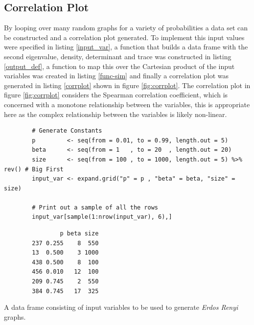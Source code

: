 \documentclass[11pt, twoside]{report}
\begin{document}
\subsection{Correlation Plot}
\label{correlation-plot}
By looping over many random graphs for a variety of probabilities a data set can
be constructed and a correlation plot generated. To implement this input values
were specified in listing \ref{input_var}, a function that builds a data frame with
the second eigenvalue, density, determinant and trace was constructed in listing
\ref{output_def}, a function to map this over the Cartesian product of the input
variables was created in listing \ref{func-sim} and finally a correlation plot
was generated in listing \ref{corrplot} shown in figure \ref{fig:corrplot}. The
correlation plot in figure \ref{fig:corrplot} considers the Spearman correlation
coefficient, which is concerned with a monotone relationship between the
variables, this is appropriate here as the complex relationship between the
variables is likely non-linear.


\begin{listing}[htbp]
    \begin{tcolorbox}
        \begin{verbatim}
        # Generate Constants
        p         <- seq(from = 0.01, to = 0.99, length.out = 5)
        beta      <- seq(from = 1   , to = 20  , length.out = 20)
        size      <- seq(from = 100 , to = 1000, length.out = 5) %>% rev() # Big First
        input_var <- expand.grid("p" = p , "beta" = beta, "size" = size)

        # Print out a sample of all the rows
        input_var[sample(1:nrow(input_var), 6),]
        \end{verbatim}
    \tcblower
        \begin{verbatim}
                p beta size
        237 0.255    8  550
        13  0.500    3 1000
        438 0.500    8  100
        456 0.010   12  100
        209 0.745    2  550
        384 0.745   17  325
        \end{verbatim}
    \end{tcolorbox}
\caption{\label{input_var}A data frame consisting of input variables to be used to generate \emph{Erdos Renyi} graphs.}
\end{listing}
\end{document}
